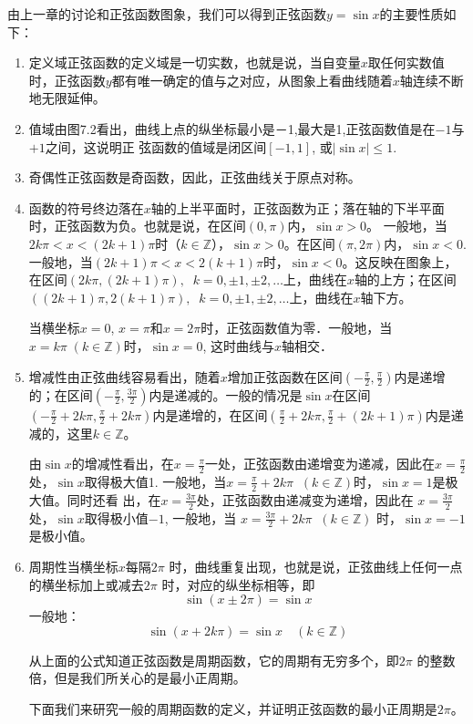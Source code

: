 由上一章的讨论和正弦函数图象，我们可以得到正弦函数$y=\sin x$的主要性质如下：
\begin{enumerate}
    \item 定义域\quad 正弦函数的定义域是一切实数，也就是说，当自变量$x$取任何实数值时，正弦函数$y$都有唯一确定的值与之对应，从图象上看曲线随着$x$轴连续不断地无限延伸。
    \item 值域\quad 由图7.2看出，曲线上点的纵坐标最小是－1,最大是1,正弦函数值是在$-1$与$+1$之间，这说明正
    弦函数的值域是闭区间$[-1, 1]$, 或$|\sin x|\le 1$.
    \item 奇偶性\quad 正弦函数是奇函数，因此，正弦曲线关于原点对称。
    \item 函数的符号\quad 终边落在$x$轴的上半平面时，正弦函数为正；落在轴的下半平面时，正弦函数为负。也就是说，在区间$(0,\pi)$内，$\sin x>0$。 一般地，当$2k\pi <x<(2k+1)\pi$时（$k\in\mathbb{Z}$），$\sin x>0$。在区间$(\pi,2\pi)$内，$\sin x<0$. 一般地，当$(2k+1)\pi<x<2(k+1)\pi$时，$\sin x<0$。这反映在图象上，在区间$(2k\pi, (2k+1)\pi),\;\; k=0,\pm1,\pm2,\ldots$上，曲线在$x$轴的上方；在区间$((2k+1)\pi, 2(k+1)\pi),\;\; k=0,\pm1,\pm2,\ldots$上，曲线在$x$轴下方。
    
    当横坐标$x=0$, $x=\pi$和$x=2\pi$时，正弦函数值为零．一般地，当$x=k\pi\; (k\in \mathbb{Z})$时，$\sin x=0$, 这时曲线与$x$轴相交．

    \item 增减性\quad 由正弦曲线容易看出，随着$x$增加正弦函数在区间$\left(-\frac{\pi}{2},\frac{\pi}{2}\right)$内是递增的；在区间$\left(-\frac{\pi}{2},\frac{3\pi}{2}\right)$内是递减的。一般的情况是$\sin x$在区间$\left(-\frac{\pi}{2}+2k\pi,\frac{\pi}{2}+2k\pi\right)$内是递增的，在区间$\left(\frac{\pi}{2}+2k\pi,\frac{\pi}{2}+(2k+1)\pi\right)$内是递减的，这里$k\in \mathbb{Z}$。
    
    由$\sin x$的增减性看出，在$x=\frac{\pi}{2}$一处，正弦函数由递增变为递减，因此在$x=\frac{\pi}{2}$处，$\sin x$取得极大值1. 一般地，当$x=\frac{\pi}{2}+2k\pi\;\; (k\in\mathbb{Z})$时，$\sin x=1$是极大值。同时还看
    出，在$x=\frac{3\pi}{2}$处，正弦函数由递减变为递增，因此在
    $x=\frac{3\pi}{2}$处，$\sin x$取得极小值$-1$, 一般地，当
    $x=\frac{3\pi}{2}+2k\pi\;\; (k\in\mathbb{Z})$
    时，$\sin x=-1$是极小值。
    \item 周期性\quad 当横坐标$x$每隔$2\pi$ 时，曲线重复出现，也就是说，正弦曲线上任何一点的横坐标加上或减去$2\pi$ 时，对应的纵坐标相等，即
\[\sin(x\pm 2\pi)=\sin x\]
一般地：
\[\sin(x+2k\pi)=\sin x\quad (k\in\mathbb{Z})\]

从上面的公式知道正弦函数是周期函数，它的周期有无穷多个，即$2\pi$ 的整数倍，但是我们所关心的是最小正周期。

下面我们来研究一般的周期函数的定义，并证明正弦函数的最小正周期是$2\pi$。
\end{enumerate}

